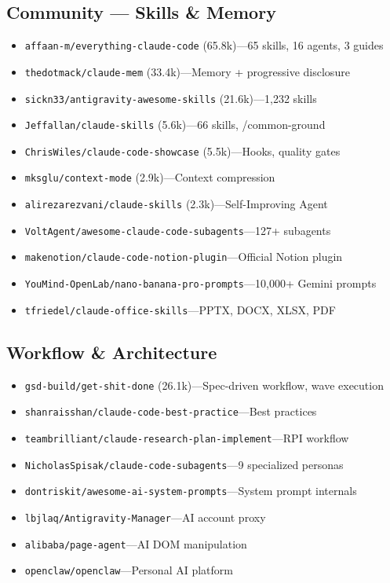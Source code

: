 \documentclass[11pt,a4paper]{article}
\begin{document}
\subsection{Community --- Skills \& Memory}
\begin{itemize}[leftmargin=1em]
  \item \texttt{affaan-m/everything-claude-code} (65.8k)---65 skills, 16 agents, 3 guides
  \item \texttt{thedotmack/claude-mem} (33.4k)---Memory + progressive disclosure
  \item \texttt{sickn33/antigravity-awesome-skills} (21.6k)---1,232 skills
  \item \texttt{Jeffallan/claude-skills} (5.6k)---66 skills, /common-ground
  \item \texttt{ChrisWiles/claude-code-showcase} (5.5k)---Hooks, quality gates
  \item \texttt{mksglu/context-mode} (2.9k)---Context compression
  \item \texttt{alirezarezvani/claude-skills} (2.3k)---Self-Improving Agent
  \item \texttt{VoltAgent/awesome-claude-code-subagents}---127+ subagents
  \item \texttt{makenotion/claude-code-notion-plugin}---Official Notion plugin
  \item \texttt{YouMind-OpenLab/nano-banana-pro-prompts}---10,000+ Gemini prompts
  \item \texttt{tfriedel/claude-office-skills}---PPTX, DOCX, XLSX, PDF
\end{itemize}

\subsection{Workflow \& Architecture}
\begin{itemize}[leftmargin=1em]
  \item \texttt{gsd-build/get-shit-done} (26.1k)---Spec-driven workflow, wave execution
  \item \texttt{shanraisshan/claude-code-best-practice}---Best practices
  \item \texttt{teambrilliant/claude-research-plan-implement}---RPI workflow
  \item \texttt{NicholasSpisak/claude-code-subagents}---9 specialized personas
  \item \texttt{dontriskit/awesome-ai-system-prompts}---System prompt internals
  \item \texttt{lbjlaq/Antigravity-Manager}---AI account proxy
  \item \texttt{alibaba/page-agent}---AI DOM manipulation
  \item \texttt{openclaw/openclaw}---Personal AI platform
\end{itemize}
\end{document}
